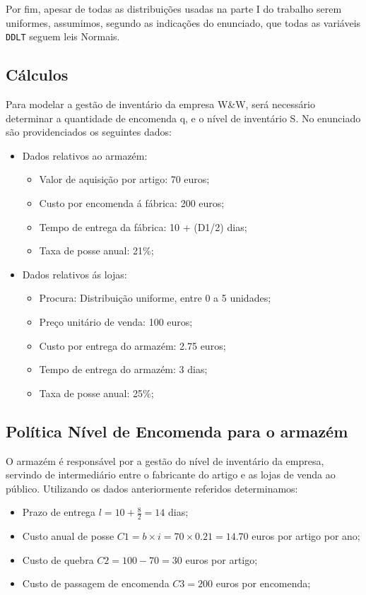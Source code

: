 Por fim, apesar de todas as distribuições usadas na parte I do trabalho serem
uniformes, assumimos, segundo as indicações do enunciado, que todas as variáveis
\texttt{DDLT} seguem leis Normais. 

\newpage

\subsection{Cálculos}

Para modelar a gestão de inventário da empresa W\&W, será necessário determinar
a quantidade de encomenda q, e o nível de inventário S. No enunciado são
providenciados os seguintes dados:

\begin{itemize}
	\item Dados relativos ao armazém:
		\begin{itemize}
			\item Valor de aquisição por artigo: 70 euros;
			\item Custo por encomenda á fábrica: 200 euros;
			\item Tempo de entrega da fábrica: 10 + (D1/2) dias;
			\item Taxa de posse anual: 21\%;
		\end{itemize}
	\item Dados relativos ás lojas:
		\begin{itemize}
			\item Procura: Distribuição uniforme, entre 0 a 5 unidades;
			\item Preço unitário de venda: 100 euros;
			\item Custo por entrega do armazém: 2.75 euros;
			\item Tempo de entrega do armazém: 3 dias;
			\item Taxa de posse anual: 25\%;
		\end{itemize}
\end{itemize}

\subsection{Política Nível de Encomenda para o armazém}

O armazém é responsável por a gestão do nível de inventário da empresa, servindo
de intermediário entre o fabricante do artigo e as lojas de venda ao público.
Utilizando os dados anteriormente referidos determinamos:

\begin{itemize}
	\item Prazo de entrega $l = 10 + \frac{8}{2}= 14$  dias;
	\item Custo anual de posse 
		$C1 = b\times i = 70 \times 0.21 = 14.70$ euros por artigo por ano;
	\item Custo de quebra $C2 = 100 - 70 = 30$ euros por artigo;
	\item Custo de passagem de encomenda $C3 = 200$ euros por encomenda;
\end{itemize}

